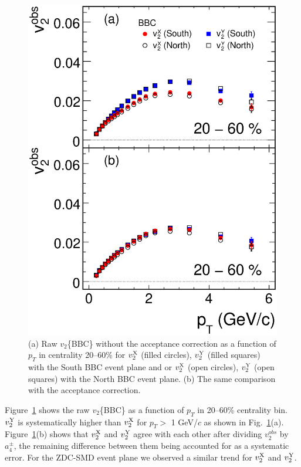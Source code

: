 \documentclass[aps,prc,superscriptaddress,showpacs,floatfix,twocolumn]{revtex4}
\newcommand \gevc{GeV/$c$\xspace}
\newcommand \pt{\mbox{$p_T$}\xspace}
\begin{document}
\begin{figure}[htbp]
\includegraphics[width=1.0\linewidth]{v2pt_xy_before_and_after_correction_cent20-60.eps}
\caption{\label{fig:v2pt_xy_before_and_after_correction_cent20-60} 
(a) Raw $v_2$\{BBC\} without the acceptance correction as a 
function of \pt in centrality 20--60\% for $v_2^{\rm X}$ (filled 
circles), $v_2^{\rm Y}$ (filled squares) with the South BBC 
event plane and or $v_2^{\rm X}$ (open circles), $v_2^{\rm Y}$ 
(open squares) with the North BBC event plane.
(b) The same comparison with the acceptance correction.
}
\end{figure}

Figure~\ref{fig:v2pt_xy_before_and_after_correction_cent20-60} shows the 
raw $v_2$\{BBC\} as a function of \pt in 20--60\% centrality bin. $v_2^{\rm 
Y}$ is systematically higher than $v_2^{\rm X}$ for \pt $>$ 1 \gevc as 
shown in Fig.~\ref{fig:v2pt_xy_before_and_after_correction_cent20-60}(a). 
Figure~\ref{fig:v2pt_xy_before_and_after_correction_cent20-60}(b) shows 
that $v_2^{\rm X}$ and $v_2^{\rm Y}$ agree with each other after dividing 
$v_2^{obs}$ by $a^{\pm}_{4}$, the remaining difference between them being 
accounted for as a systematic error. For the ZDC-SMD event plane we 
observed a similar trend for $v_2^{\rm X}$ and $v_2^{\rm Y}$.
\end{document}
